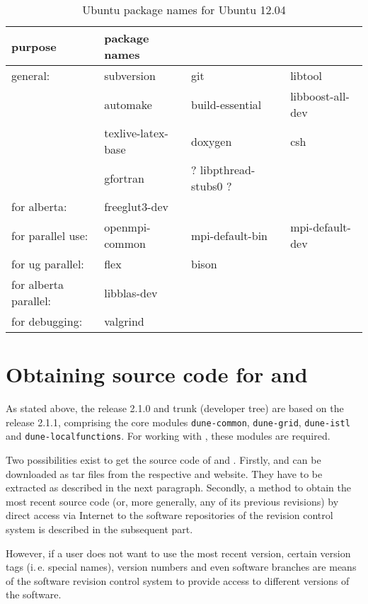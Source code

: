\begin{table}
\centering
\caption{Ubuntu package names for Ubuntu 12.04}
\begin{tabular}{llll}
\toprule
\textbf{purpose} & \textbf{package names} \\
\midrule
general: & subversion & git & libtool \\
& automake & build-essential & libboost-all-dev \\
& texlive-latex-base & doxygen & csh\\
& gfortran & ? libpthread-stubs0 ?\\
\midrule
for alberta: & freeglut3-dev &  \\
\midrule
for parallel use: & openmpi-common & mpi-default-bin & mpi-default-dev \\
\midrule
for ug parallel: & flex & bison & \\
\midrule
for alberta parallel: & libblas-dev &\\
\midrule
for debugging: & valgrind &\\
\bottomrule
\end{tabular}
\label{tbl:ubuntu-pkg}
\end{table}

\section{Obtaining source code for \Dune and \Dumux}
As stated above, the \Dumux release 2.1.0 and trunk (developer tree) are based on the \Dune release 2.1.1, 
comprising the core modules \texttt{dune-common}, \texttt{dune-grid}, \texttt{dune-istl} and \texttt{dune-localfunctions}.
For working with \Dumux, these modules are required.

Two possibilities exist to get the source code of \Dune and \Dumux.
Firstly, \Dune and \Dumux can be downloaded as tar files from the respective \Dune and \Dumux website. They have to be extracted as described in the next paragraph.
Secondly, a method to obtain the most recent source code (or, more generally, any of its previous revisions) by direct access 
via Internet to the software repositories of the revision control system is described in the subsequent part. 

However, if a user does not want to use the most recent version,
certain version tags (i.\,e. special names), version numbers and even software branches are means 
of the software revision control system to provide access to different versions of the software.

